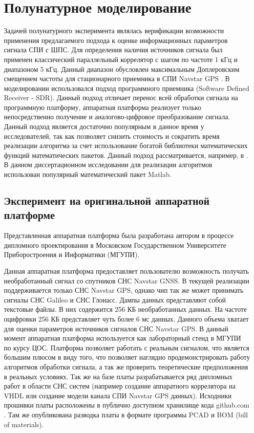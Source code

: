 \chapter{Полунатурное моделирование}
\label{ss:hw}

Задачей полунатурного эксперимента являлась верификации возможности применения предлагаемого подхода к оценке информационных параметров сигнала СПИ с ШПС. Для определения наличия источников
сигнала был применен классический параллельный коррелятор \cite{tsui} с шагом по частоте 1 кГц и диапазоном 5 кГц. Данный диапазон обусловлен максимальным Доплеровским
смещением частоты для стационарного приемника в СПИ Navstar GPS \cite{shahtarin_sync, tsui}. В моделировании использовался подход программного приемника
(Software Defined Receiver - SDR). Данный подход отличает перенос всей обработки сигнала на программную платформу, аппаратная платформа реализует только непосредственно
получение и аналогово-цифровое  преобразование сигнала. Данный подход является достаточно популярным в данное время у исследователей, так как позволяет снизить стоимость и
сократить время реализации алгоритма за счет использование богатой библиотеки математических функций математических пакетов. Данный подход рассматривается, например, в \cite{grayver-book}.
В данном диссертационном исследовании для реализации алгоритмов использован популярный математический пакет Matlab.

\section{Эксперимент на оригинальной аппаратной платформе}
Представленная аппаратная платформа была разработана автором в процессе дипломного проектирования в Московском Государственном Университете Приборостроения и Информатики (МГУПИ).

Данная аппаратная платформа предоставляет пользователю возможность получать необработанный сигнал со спутников СНС Navstar GNSS. В текущей реализации поддерживается только 
СНС Navstar GPS, однако чип так же может принимать сигналы СНС Galileo и СНС Глонасс. Дампы данных представляют собой текстовые файлы. В них содержится 256 КБ необработанных данных.
На частоте оцифровки 256 КБ представляет чуть более 6 мс данных. Данного объема хватает для оценки параметров источников сигналов СНС Navstar GPS.
В данный момент аппаратная платформа используется как лабораторный стенд в МГУПИ по курсу ЦОС. Платформа позволяет работать с реальным сигналом, что является большим плюсом в
виду того, что позволяет наглядно продемонстрировать работу алгоритмов обработки сигнала, а так же проверить теоретические предположения в реальных условиях.
Так же на базе платы разрабатывается ряд дипломных работ в области СНС систем (например создание аппаратного коррелятора на VHDL или создание модели канала 
СПИ Navstar GPS данных). Исходники прошивки платы расположены в публично доступном хранилище кода github.com \cite{github-gpsproject}.
Там же опубликована разводка платы в формате программы PCAD и BOM (bill of materials).

